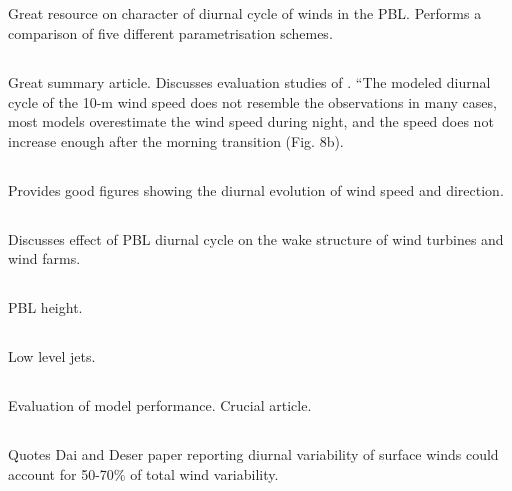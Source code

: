 \documentclass{article}
\begin{document}
\subsection{\citet{zhang04}}
Great resource on character of diurnal cycle of winds in the PBL. Performs a comparison of five different parametrisation schemes. 

\subsection{\citet{holtslag13}}
Great summary article. Discusses evaluation studies of \citet{svensson11}. ``The modeled diurnal cycle of the 10-m wind speed does not resemble the observations in many cases, most models overestimate the wind speed during night, and the speed does not increase enough after the morning transition (Fig. 8b).

\subsection{\citet{hoxit75}}
Provides good figures showing the diurnal evolution of wind speed and direction. 

\subsection{\citet{englberger18}}
Discusses effect of PBL diurnal cycle on the wake structure of wind turbines and wind farms. 

\subsection{\citet{liu10}}
PBL height. 

\subsection{\citet{stensrud96}}
Low level jets. 

\subsection{\citet{svensson11}}
Evaluation of model performance. Crucial article. 

\subsection{\citet{zhang04}}
Quotes Dai and Deser paper reporting diurnal variability of surface winds could account for 50-70$\%$ of total wind variability. 
\end{document}
